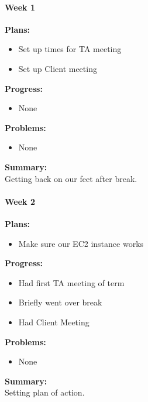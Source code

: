 \paragraph{Week 1}
\begin{adjustwidth}{2.5em}{0pt}
    \vspace{-0.5cm}\textbf{Plans:}
    \vspace{-0.5cm}
    \begin{itemize}
        \item Set up times for TA meeting 
		\item Set up Client meeting
    \end{itemize} 
    \vspace{-0.3cm}\textbf{Progress:}
    \vspace{-0.5cm}
    \begin{itemize}
        \item None
    \end{itemize} 
    \vspace{-0.3cm}\textbf{Problems:}
    \vspace{-0.5cm}
    \begin{itemize}
        \item None
    \end{itemize}  
    \vspace{-0.3cm}\noindent\textbf{Summary:}\\
    \noindent Getting back on our feet after break. 
\end{adjustwidth}
\paragraph{Week 2}
\begin{adjustwidth}{2.5em}{0pt}
    \vspace{-0.5cm}\textbf{Plans:}
    \vspace{-0.5cm}
    \begin{itemize}
        \item Make sure our EC2 instance works
    \end{itemize} 
    \vspace{-0.3cm}\textbf{Progress:}
    \vspace{-0.5cm}
    \begin{itemize}
        \item Had first TA meeting of term
		\item Briefly went over break
		\item Had Client Meeting 
    \end{itemize} 
    \vspace{-0.3cm}\textbf{Problems:}
    \vspace{-0.5cm}
    \begin{itemize}
        \item None
    \end{itemize}  
    \vspace{-0.3cm}\noindent\textbf{Summary:}\\
    \noindent Setting plan of action.
	\end{adjustwidth} 
